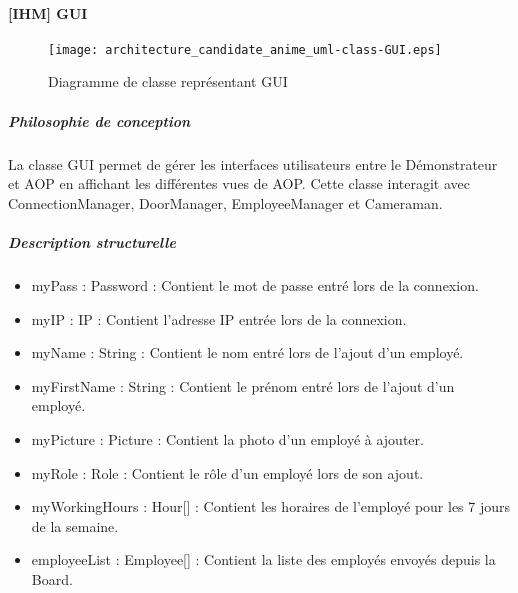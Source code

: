 \newpage

    \paragraph{[IHM] GUI}%
    \begin{figure} [H]
        \centering
        \texttt{[image: architecture\_candidate\_anime\_uml-class-GUI.eps]}
        \caption{Diagramme de classe représentant GUI}
        \label{Classe_GUI}
    \end{figure}
        \subparagraph{Philosophie de conception}%
        La classe GUI permet de gérer les interfaces utilisateurs entre le Démonstrateur et AOP en affichant les différentes vues de AOP.
        Cette classe interagit avec ConnectionManager, DoorManager, EmployeeManager et Cameraman.
        \subparagraph{Description structurelle}%
            \begin{itemize}
                \item myPass : Password : Contient le mot de passe entré lors de la connexion.
                \item myIP : IP : Contient l'adresse IP entrée lors de la connexion.
                \item myName : String : Contient le nom entré lors de l'ajout d'un employé.
                \item myFirstName : String : Contient le prénom entré lors de l'ajout d'un employé.
                \item myPicture : Picture : Contient la photo d'un employé à ajouter.
                \item myRole : Role : Contient le rôle d'un employé lors de son ajout.
                \item myWorkingHours : Hour[] : Contient les horaires de l'employé pour les 7 jours de la semaine.
                \item employeeList : Employee[] : Contient la liste des employés envoyés depuis la Board.
            \end{itemize}

